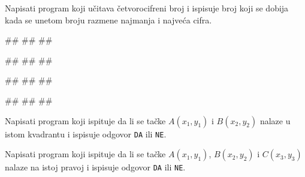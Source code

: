 \begin{Exercise}[label=p1.2_08] 
 Napisati program koji učitava četvorocifreni broj i ispisuje broj koji se dobija kada se unetom broju razmene najmanja i najveća cifra. 

\begin{miditest}
\begin{upotreba}{1}
#\naslovInt#
##
##
\end{upotreba}
\end{miditest}
\begin{miditest}
\begin{upotreba}{2}
#\naslovInt#
##
##
\end{upotreba}
\end{miditest}

\begin{miditest}
\begin{upotreba}{3}
#\naslovInt#
##
##
\end{upotreba}
\end{miditest}
\begin{miditest}
\begin{upotreba}{4}
#\naslovInt#
##
##
\end{upotreba}
\end{miditest}

\end{Exercise}
\begin{Answer}[ref=p1.2_08]
\end{Answer}

\begin{Exercise}[label=p1_19]
Napisati program koji ispituje da li se tačke $A(x_1, y_1)$ i $B(x_2, y_2)$ nalaze u istom kvadrantu i ispisuje odgovor
\verb|DA| ili \verb|NE|. 

\end{Exercise}


\begin{Exercise}[label=p1_20]
Napisati program koji ispituje da li se tačke $A(x_1, y_1)$, $B(x_2, y_2)$ i $C(x_3, y_3)$ nalaze na istoj pravoj i
ispisuje odgovor \verb|DA| ili \verb|NE|. \\

\end{Exercise}


